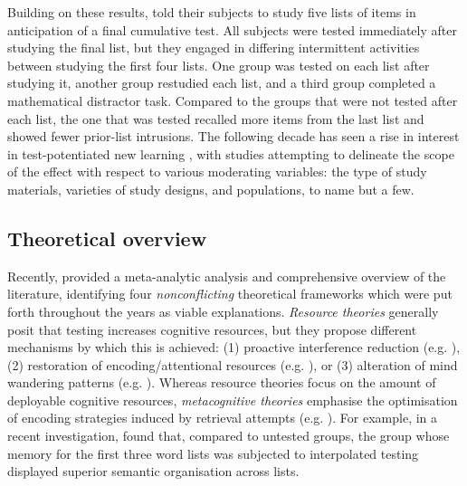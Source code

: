 \documentclass[../main.tex]{subfiles}
\begin{document}
Building on these results, \cite{szpunarTestingStudyInsulates2008} told their subjects to study five lists of items in anticipation of a final cumulative test. All subjects were tested immediately after studying the final list, but they engaged in differing intermittent activities between studying the first four lists. One group was tested on each list after studying it, another group restudied each list, and a third group completed a mathematical distractor task. Compared to the groups that were not tested after each list, the one that was tested recalled more items from the last list and showed fewer prior-list intrusions. The following decade has seen a rise in interest in test-potentiated new learning \citep{chanRetrievalPotentiatesNew2018, pastotterRetrievalPracticeEnhances2014, yangEnhancingLearningRetrieval2018}, with studies attempting to delineate the scope of the effect with respect to various moderating variables: the type of study materials, varieties of study designs, and populations, to name but a few. 

\subsection{Theoretical overview}

Recently, \cite{chanRetrievalPotentiatesNew2018} provided a meta-analytic analysis and comprehensive overview of the literature, identifying four \textit{nonconflicting} theoretical frameworks which were put forth throughout the years as viable explanations. \textit{Resource theories} generally posit that testing increases cognitive resources, but they propose different mechanisms by which this is achieved: (1) proactive interference reduction (e.g. \citealp{wahlheimTestingCanCounteract2015, weinsteinTestingProtectsProactive2011, szpunarTestingStudyInsulates2008, nunesTestingImprovesTrue2012}), (2) restoration of encoding/attentional resources (e.g. \citealp{pastotterRetrievalLearningFacilitates2011}), or (3) alteration of mind wandering patterns (e.g. \citealp{jingInterpolatedTestingInfluences2016,szpunarInterpolatedMemoryTests2013,szpunarMindWanderingEducation2013}). Whereas resource theories focus on the amount of deployable cognitive resources, \textit{metacognitive theories} emphasise the optimisation of encoding strategies induced by retrieval attempts (e.g. \citealp{choTestingEnhancesBoth2017, chanTestingPotentiatesNew2018}). For example, in a recent investigation, \cite{chanTestingPotentiatesNew2018} found that, compared to untested groups, the group whose memory for the first three word lists was subjected to interpolated testing displayed superior semantic organisation across lists. 
\end{document}
